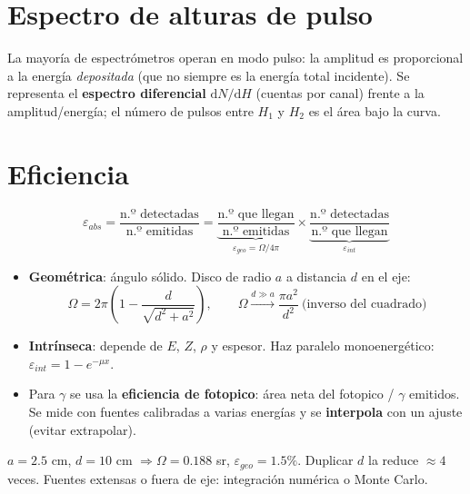 \section{Espectro de alturas de pulso}
La mayoría de espectrómetros operan en modo pulso: la amplitud es proporcional a la energía
\emph{depositada} (que no siempre es la energía total incidente). Se representa el \textbf{espectro
diferencial} $\mathrm{d}N/\mathrm{d}H$ (cuentas por canal) frente a la amplitud/energía; el número de pulsos entre
$H_1$ y $H_2$ es el área bajo la curva.

\section{Eficiencia}
\begin{clave}[Eficiencia]
\[
\varepsilon_{abs}=\frac{\text{n.º detectadas}}{\text{n.º emitidas}}
=\underbrace{\frac{\text{n.º que llegan}}{\text{n.º emitidas}}}_{\varepsilon_{geo}=\Omega/4\pi}\times
\underbrace{\frac{\text{n.º detectadas}}{\text{n.º que llegan}}}_{\varepsilon_{int}}
\]
\begin{itemize}
\item \textbf{Geométrica}: ángulo sólido. Disco de radio $a$ a distancia $d$ en el eje:
\[ \Omega=2\pi\left(1-\frac{d}{\sqrt{d^2+a^2}}\right),\qquad \Omega\xrightarrow{d\gg a}\frac{\pi a^2}{d^2}\ \text{(inverso del cuadrado)} \]
\item \textbf{Intrínseca}: depende de $E$, $Z$, $\rho$ y espesor. Haz paralelo monoenergético: $\varepsilon_{int}=1-e^{-\mu x}$.
\item Para $\gamma$ se usa la \textbf{eficiencia de fotopico}: área neta del fotopico / $\gamma$ emitidos. Se mide con
fuentes calibradas a varias energías y se \textbf{interpola} con un ajuste (evitar extrapolar).
\end{itemize}
\end{clave}
\begin{ejemplo}
$a=2.5$ cm, $d=10$ cm $\Rightarrow\Omega=0.188$ sr, $\varepsilon_{geo}=1.5\%$. Duplicar $d$ la reduce $\approx4$ veces.
Fuentes extensas o fuera de eje: integración numérica o Monte Carlo.
\end{ejemplo}


